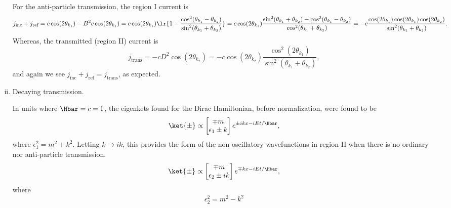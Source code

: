 \begin{enumerate}[(i)]
For the anti-particle transmission, the region I current is
%
\begin{dmath}\label{eqn:gradQuantumProblemSet4Problem3:1001}
j_{\textrm{inc}}
+ j_{\textrm{ref}}
=
c \cos( 2 \theta_{k_1} ) - B^2 c \cos( 2 \theta_{k_1} )
=
c \cos( 2 \theta_{k_1} )
\lr{ 1 -
\frac{ \cos^2(\theta_{k_1} - \theta_{k_2}) }{\sin^2(\theta_{k_1} + \theta_{k_2})} }
=
c \cos( 2 \theta_{k_1} )
\frac{ \sin^2(\theta_{k_1} + \theta_{k_2}) - \cos^2(\theta_{k_1} - \theta_{k_2}) }{\cos^2(\theta_{k_1} + \theta_{k_2})}
=
-c
\frac{ \cos( 2 \theta_{k_1} ) \cos(2 \theta_{k_1}) \cos(2 \theta_{k_2})}
{\sin^2(\theta_{k_1} + \theta_{k_2})}.
\end{dmath}
%
Whereas, the transmitted (region II) current is
\begin{dmath}\label{eqn:gradQuantumProblemSet4Problem3:1021}
j_{\textrm{trans}}
=
 -c D^2 \cos( 2 \theta_{k_2} )
=
 -c \cos( 2 \theta_{k_2} )
\frac{ \cos^2(2 \theta_{k_1}) }{\sin^2(\theta_{k_1} + \theta_{k_2})},
\end{dmath}
%
and again we see \( j_{\textrm{inc}} + j_{\textrm{ref}} = j_{\textrm{trans}} \), as expected.

\item Decaying transmission.

In units where \( \Hbar = c = 1 \), the eigenkets found for the Dirac Hamiltonian, before normalization, were found to be
%
\begin{equation}\label{eqn:gradQuantumProblemSet4Problem3:1041}
\ket{\pm} \propto
\begin{bmatrix}
\mp m \\
\epsilon_1 \pm k
\end{bmatrix}
e^{\pm i k x - i E t/\Hbar},
\end{equation}
%
where \( \epsilon_1^2 = m^2 + k^2 \).  Letting \( k \rightarrow i k \), this provides the form of the non-oscillatory wavefunctions in region II when there is no ordinary nor anti-particle transmission.
%
\begin{equation}\label{eqn:gradQuantumProblemSet4Problem3:1061}
\ket{\pm} \propto
\begin{bmatrix}
\mp m \\
\epsilon_2 \pm i k
\end{bmatrix}
e^{\mp k x - i E t/\Hbar},
\end{equation}
%
where
%
\begin{equation}\label{eqn:gradQuantumProblemSet4Problem3:1081}
\epsilon_2^2 = m^2 - k^2
\end{equation}


\end{enumerate}
